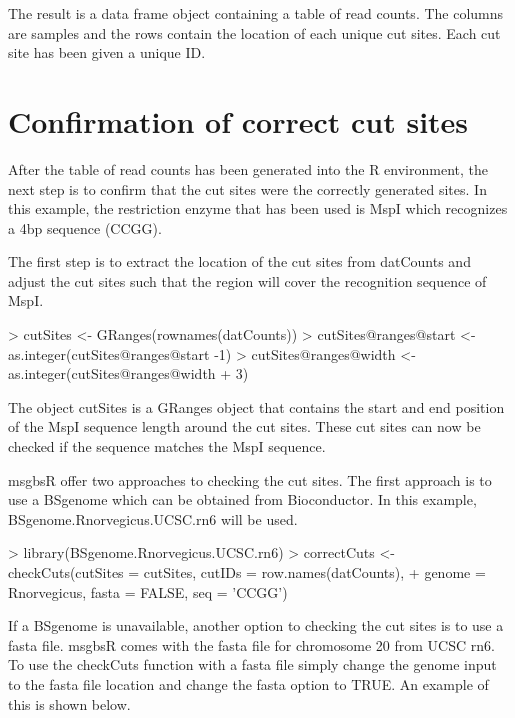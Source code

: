 \documentclass{article}
\begin{document}
The result is a data frame object containing a table of read counts. The columns are samples and the rows contain the location of each unique cut sites. Each cut site has been given a unique ID.

\section{Confirmation of correct cut sites}

After the table of read counts has been generated into the R environment, the next step is to confirm that the cut sites were the correctly generated sites. In this example, the restriction enzyme that has been used is MspI which recognizes a 4bp sequence (CCGG).

The first step is to extract the location of the cut sites from datCounts and adjust the cut sites such that the region will cover the recognition sequence of MspI.

\begin{Schunk}
\begin{Sinput}
> cutSites  <- GRanges(rownames(datCounts))
> cutSites@ranges@start <- as.integer(cutSites@ranges@start -1)
> cutSites@ranges@width <- as.integer(cutSites@ranges@width + 3)
\end{Sinput}
\end{Schunk}

The object cutSites is a GRanges object that contains the start and end position of the MspI sequence length around the cut sites. These cut sites can now be checked if the sequence matches the MspI sequence.

msgbsR offer two approaches to checking the cut sites. The first approach is to use a BSgenome which can be obtained from Bioconductor. In this example, BSgenome.Rnorvegicus.UCSC.rn6 will be used.

\begin{Schunk}
\begin{Sinput}
> library(BSgenome.Rnorvegicus.UCSC.rn6)
> correctCuts <- checkCuts(cutSites = cutSites, cutIDs = row.names(datCounts),
+                          genome = Rnorvegicus, fasta = FALSE, seq = 'CCGG')
\end{Sinput}
\end{Schunk}

If a BSgenome is unavailable, another option to checking the cut sites is to use a fasta file. msgbsR comes with the fasta file for chromosome 20 from UCSC rn6. To use the checkCuts function with a fasta file simply change the genome input to the fasta file location and change the fasta option to TRUE. An example of this is shown below.
\end{document}

